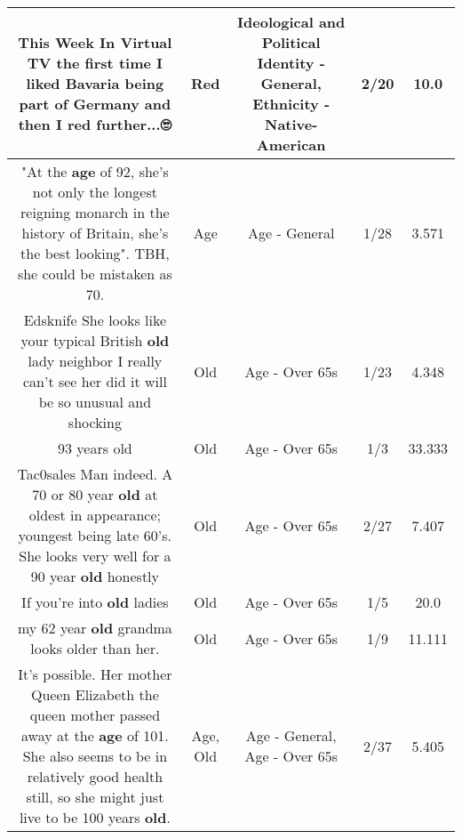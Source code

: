 \documentclass[11pt]{article}
\newlength\mylength
\begin{document}
\begin{center}
\begin{longtable}{|C{.65\mylength}|C{.30\mylength}|C{.12\mylength}|C{.12\mylength}|C{.12\mylength}|}
  \small This Week In Virtual TV the first time I liked Bavaria being part of Germany and then I \textbf{r\textbf{ed}} further...🙄\normalsize   & Red &  Ideological and Political Identity - General, Ethnicity - Native-American & 2/20 & 10.0 \\  \hline
  \small "At the \textbf{age} of 92, she's not only the longest reigning monarch in the history of Britain, she's the best looking". TBH, she could be mistaken as 70.\normalsize   & Age & Age - General & 1/28 & 3.571 \\  \hline
  \small Edsknife She looks like your typical British \textbf{old} lady neighbor I really can't see her did it will be so unusual and shocking\normalsize   & Old & Age - Over 65s & 1/23 & 4.348 \\  \hline
  \small 93 years old\normalsize   & Old & Age - Over 65s & 1/3 & 33.333 \\  \hline
  \small Tac0sales Man indeed. A 70 or 80 year \textbf{old} at oldest in appearance; youngest being late 60's. She looks very well for a 90 year \textbf{old} honestly\normalsize   & Old & Age - Over 65s & 2/27 & 7.407 \\  \hline
  \small If you're into \textbf{old} ladies\normalsize   & Old & Age - Over 65s & 1/5 & 20.0 \\  \hline
  \small my 62 year \textbf{old} grandma looks older than her.\normalsize   & Old & Age - Over 65s & 1/9 & 11.111 \\  \hline
  \small {} It's possible. Her mother Queen Elizabeth the queen mother passed away at the \textbf{age} of 101. She also seems to be in relatively good health still, so she might just live to be 100 years \textbf{old}.\normalsize   & Age, Old & Age - General, Age - Over 65s & 2/37 & 5.405 \\  \hline

\end{longtable}
\end{center}
\end{document}

